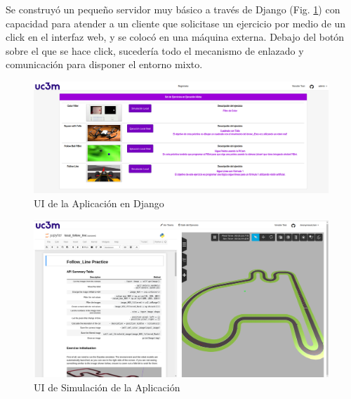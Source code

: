 Se construyó un pequeño servidor muy básico a través de Django (Fig. \ref{appui}) con capacidad para atender a un cliente que solicitase un ejercicio por medio de un click en el interfaz web, y se colocó en una máquina externa. Debajo del botón sobre el que se hace click, sucedería todo el mecanismo de enlazado y comunicación para disponer el entorno mixto.

\begin{figure}[!hbtp]  \centering\noindent
    \includegraphics[width=0.99\textwidth]{figures/app_ui.png}
    \caption{UI de la Aplicación en Django}
    \label{appui}
\end{figure}

\begin{figure}[!hbtp]  \centering\noindent
    \includegraphics[width=0.99\textwidth]{figures/ui_simulation.png}
    \caption{UI de Simulación de la Aplicación}
    \label{simui}
\end{figure}

